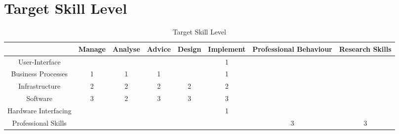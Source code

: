 
\section{Target Skill Level}
\label{sec:target}


\begin{table}[H]
	\centering
	\begin{tabular}{|c|c|c|c|c|c|c|c|}
		\hline
		& Manage & Analyse & Advice & Design & Implement & Professional Behaviour & Research Skills \\ \hline
		User-Interface & & & & & 1 & & \\ \hline
		Business Processes & 1 & 1 & 1 & & 1 & & \\ \hline
		Infrastructure & 2 & 2 & 2 & 2 & 2 & & \\ \hline
		Software & \cellcolor[HTML]{FD6864}3 & 2 & \cellcolor[HTML]{FD6864}3 & \cellcolor[HTML]{FD6864}3 &\cellcolor[HTML]{FD6864} 3 & & \\ \hline
		Hardware Interfacing & & & & & 1 & & \\ \hline
		Professional Skills & & & & & & \cellcolor[HTML]{FD6864}3 &\cellcolor[HTML]{FD6864} 3 \\ \hline             
	\end{tabular}
	\caption{Target Skill Level}
	\label{targetskills}
\end{table}